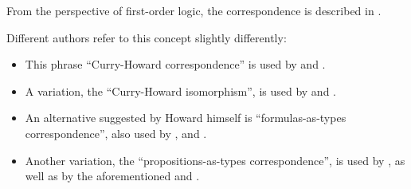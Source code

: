 \begin{comments}
  \item From the perspective of first-order logic, the correspondence is described in \cite[def. 5.1.11]{Mimram2020ProgramEqualsProof}.

  \item Different authors refer to this concept slightly differently:
  \begin{itemize}
    \item This phrase \enquote{Curry-Howard correspondence} is used by \textcite[45]{AwodeyWarren2009HoTT} and \textcite[def. 4.1.7]{Mimram2020ProgramEqualsProof}.

    \item A variation, the \enquote{Curry-Howard isomorphism}, is used by \textcite[74]{Hindley1997BasicSTT} and \textcite[14]{GirardEtAl1989ProofsAndTypes}.

    \item An alternative suggested by Howard himself is \enquote{formulas-as-types correspondence}, also used by \textcite[74]{Hindley1997BasicSTT}, \textcite[\S 1.3.4]{TroelstraSchwichtenberg2000BasicProofTheory} and \textcite[572]{Barendregt1984LambdaCalculus}.

    \item Another variation, the \enquote{propositions-as-types correspondence}, is used by \textcite[def. 5.4.14]{Barendregt1992LambdaCalculiWithTypes}, as well as by the aforementioned \textcite[8]{AwodeyWarren2009HoTT} and \textcite[def. 4.1.7]{Mimram2020ProgramEqualsProof}.
  \end{itemize}
\end{comments}

